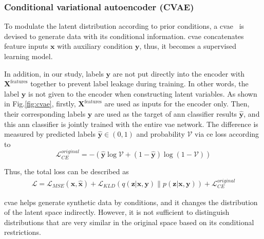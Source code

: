 \documentclass[twoside,twocolumn,9pt]{article}
\begin{document}
\subsubsection{Conditional variational autoencoder (CVAE)}\label{mtd:cvae}
To modulate the latent distribution according to prior conditions, a \acrshort*{cvae}~\cite{sohn2015learning} is devised to generate data with its conditional information. \acrshort*{cvae} concatenates feature inputs $\mathbf{x}$ with auxiliary condition $\mathbf{y}$, thus, it becomes a supervised learning model. 

In addition, in our study, labels $\mathbf{y}$ are not put directly into the encoder with $\textbf{X}^{\textrm{features}}$ together to prevent label leakage during training. In other words, the label $\mathbf{y}$ is not given to the encoder when constructing latent variables. As shown in Fig.\ref{fig:cvae}, firstly, $\textbf{X}^{\textrm{features}}$ are used as inputs for the encoder only. Then, their corresponding labels $\mathbf{y}$ are used as the target of \acrfull*{ann} classifier results $\mathbf{\hat{y}}$, and this \acrshort*{ann} classifier is jointly trained with the entire \acrshort*{vae} network. The difference is measured by predicted labels $\mathbf{\hat{y}}\in(0,1)$ and probability $\mathcal{V}$ via \acrfull*{ce} loss according to
\begin{equation}
\mathcal{L}_{CE}^{original} = -(\mathbf{\hat{y}} \log \mathcal{V}+(1-\mathbf{\hat{y}}) \log (1-\mathcal{V}))
\end{equation}

Thus, the total loss can be described as
\begin{align}
   \mathcal{L} = \mathcal{L}_{MSE}(\mathbf{x}, \hat{\mathbf{x}}) + \mathcal{L}_{KLD}(q(\mathbf{z|x,y}) \| p(\mathbf{z|x,y})) + \mathcal{L}_{CE}^{original}
\end{align}

\acrshort*{cvae} helps generate synthetic data by conditions, and it changes the distribution of the latent space indirectly. However, it is not sufficient to distinguish distributions that are very similar in the original space based on its conditional restrictions. 
\end{document}
